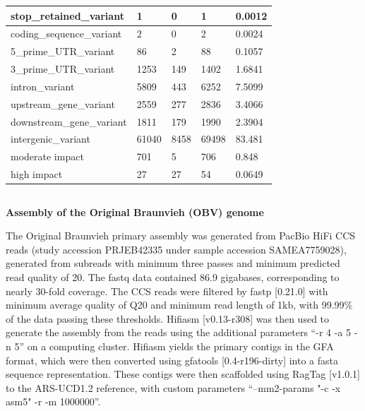 \documentclass[../main.tex]{subfiles}
\begin{document}
\begin{flushleft}
\begin{table}[!htb]
\begin{tabular}{|l|l|l|l|l|}
    \hline
    stop\_retained\_variant      & 1             & 0               & 1            & 0.0012                    \\
    \hline
    coding\_sequence\_variant    & 2             & 0               & 2            & 0.0024                    \\
    \hline
    5\_prime\_UTR\_variant       & 86            & 2               & 88           & 0.1057                    \\
    \hline
    3\_prime\_UTR\_variant       & 1253          & 149             & 1402         & 1.6841                    \\
    \hline
    intron\_variant              & 5809          & 443             & 6252         & 7.5099                    \\
    \hline
    upstream\_gene\_variant      & 2559          & 277             & 2836         & 3.4066                    \\
    \hline
    downstream\_gene\_variant    & 1811          & 179             & 1990         & 2.3904                    \\
    \hline
    intergenic\_variant          & 61040         & 8458            & 69498        & 83.481                    \\
    \hline
    moderate impact              & 701           & 5               & 706          & 0.848                     \\
    \hline
    high impact                  & 27            & 27              & 54           & 0.0649                    \\
    \hline
    \end{tabular}
\end{table}

\newpage

\subsection{}
\label{sup_not:s41}
\textbf{Assembly of the Original Braunvieh (OBV) genome}

\bigskip
The Original Braunvieh primary assembly was generated from PacBio HiFi CCS reads (study accession PRJEB42335 under sample accession SAMEA7759028), generated from subreads with minimum three passes and minimum predicted read quality of 20.  The fastq data contained 86.9 gigabases, corresponding to nearly 30-fold coverage. The CCS reads were filtered by fastp [0.21.0] \citep{chen2018fastp} with minimum average quality of Q20 and minimum read length of 1kb, with 99.99\% of the data passing these thresholds. Hifiasm [v0.13-r308] \citep{cheng2021haplotype} was then used to generate the assembly from the reads using the additional parameters “-r 4 -a 5 -n 5” on a computing cluster. Hifiasm yields the primary contigs in the GFA format, which were then converted using gfatools [0.4-r196-dirty] into a fasta sequence representation. These contigs were then scaffolded using RagTag [v1.0.1] \citep{alonge2019ragoo} to the ARS-UCD1.2 reference, with custom parameters “--mm2-params "-c -x asm5" -r -m 1000000”.


\end{flushleft}
\end{document}
